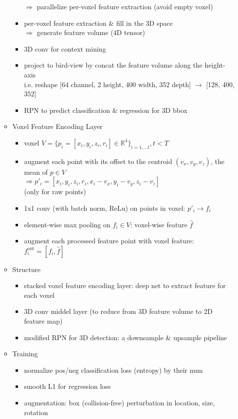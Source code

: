 \begin{itemize}
\begin{itemize}
\begin{itemize}
		$\Rightarrow$ parallelize per-voxel feature extraction (avoid empty voxel)
		\item per-voxel feature extraction \& fill in the 3D space \\
		$\Rightarrow$ generate feature volume (4D tensor)
		\item 3D conv for context mining
		\item project to bird-view by concat the feature volume along the height-axis \\
		i.e. reshape [64 channel, 2 height, 400 width, 352 depth] $\rightarrow$ [128, 400, 352]
		\item RPN to predict classification \& regression for 3D bbox
		\end{itemize}
	\item Voxel Feature Encoding Layer
		\begin{itemize}
		\item voxel $V=\{p_i=[x_i,y_i,z_i,r_i]\in \mathbb R^4 \}_{i=1,...t}, t<T$
		\item augment each point with its offset to the centroid $(v_x,v_y,v_z)$, the mean of $p\in V$ \\
		$\Rightarrow p'_i = [x_i,y_i,z_i,r_i,x_i-v_x, y_i-v_y, z_i-v_z]$ \\
		(only for raw points)
		\item 1x1 conv (with batch norm, ReLu) on points in voxel: $p'_i\rightarrow f_i$
		\item element-wise max pooling on $f_i\in V$: voxel-wise feature $\hat f$
		\item augment each processed feature point with voxel feature: $f_i^\text{out}=[f_i,\hat f]$
		\end{itemize}
	\item Structure
		\begin{itemize}
		\item stacked voxel feature encoding layer: deep net to extract feature for each voxel
		\item 3D conv middel layer (to reduce from 3D feature volume to 2D feature map)
		\item modified RPN for 3D detection: a downsample \& upsample pipeline
		\end{itemize}
	\item Training
		\begin{itemize}
		\item normalize pos/neg classification loss (entropy) by their num
		\item smooth L1 for regression loss
		\item augmentation: box (collision-free) perturbation in location, size, rotation

\end{itemize}
\end{itemize}
\end{itemize}
